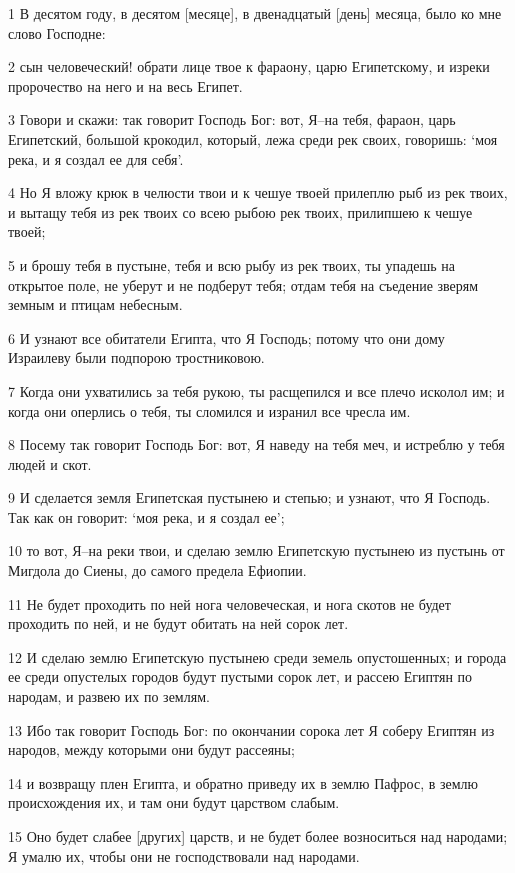 \par 1 В десятом году, в десятом [месяце], в двенадцатый [день] месяца, было ко мне слово Господне:
\par 2 сын человеческий! обрати лице твое к фараону, царю Египетскому, и изреки пророчество на него и на весь Египет.
\par 3 Говори и скажи: так говорит Господь Бог: вот, Я--на тебя, фараон, царь Египетский, большой крокодил, который, лежа среди рек своих, говоришь: `моя река, и я создал ее для себя'.
\par 4 Но Я вложу крюк в челюсти твои и к чешуе твоей прилеплю рыб из рек твоих, и вытащу тебя из рек твоих со всею рыбою рек твоих, прилипшею к чешуе твоей;
\par 5 и брошу тебя в пустыне, тебя и всю рыбу из рек твоих, ты упадешь на открытое поле, не уберут и не подберут тебя; отдам тебя на съедение зверям земным и птицам небесным.
\par 6 И узнают все обитатели Египта, что Я Господь; потому что они дому Израилеву были подпорою тростниковою.
\par 7 Когда они ухватились за тебя рукою, ты расщепился и все плечо исколол им; и когда они оперлись о тебя, ты сломился и изранил все чресла им.
\par 8 Посему так говорит Господь Бог: вот, Я наведу на тебя меч, и истреблю у тебя людей и скот.
\par 9 И сделается земля Египетская пустынею и степью; и узнают, что Я Господь. Так как он говорит: `моя река, и я создал ее';
\par 10 то вот, Я--на реки твои, и сделаю землю Египетскую пустынею из пустынь от Мигдола до Сиены, до самого предела Ефиопии.
\par 11 Не будет проходить по ней нога человеческая, и нога скотов не будет проходить по ней, и не будут обитать на ней сорок лет.
\par 12 И сделаю землю Египетскую пустынею среди земель опустошенных; и города ее среди опустелых городов будут пустыми сорок лет, и рассею Египтян по народам, и развею их по землям.
\par 13 Ибо так говорит Господь Бог: по окончании сорока лет Я соберу Египтян из народов, между которыми они будут рассеяны;
\par 14 и возвращу плен Египта, и обратно приведу их в землю Пафрос, в землю происхождения их, и там они будут царством слабым.
\par 15 Оно будет слабее [других] царств, и не будет более возноситься над народами; Я умалю их, чтобы они не господствовали над народами.
